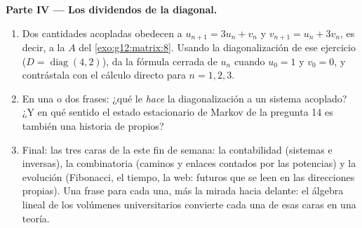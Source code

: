 \begin{problem}
\medskip
\noindent\textbf{Parte IV --- Los dividendos de la diagonal.}
\begin{enumerate}[resume]
  \item Dos cantidades acopladas obedecen a $u_{n+1} = 3u_n + v_n$ y
        $v_{n+1} = u_n + 3v_n$, es decir, a la  $A$ del
        \cref{exo:g12:matrix:8}. Usando la diagonalización de ese ejercicio
        ($D = \operatorname{diag}(4, 2)$), da la fórmula cerrada de $u_n$
        cuando $u_0 = 1$ y $v_0 = 0$, y contrástala con el cálculo directo
        para $n = 1, 2, 3$.
  \item En una o dos frases: ¿qué le \emph{hace} la diagonalización a un
        sistema acoplado? ¿Y en qué sentido el estado estacionario de
        Markov de la pregunta 14 es también una historia de 
        propios?
  \item Final: las tres caras de la  este fin de semana: la
        contabilidad (sistemas e inversas), la combinatoria (caminos y
        enlaces contados por las potencias) y la evolución (Fibonacci, el
        tiempo, la web: futuros que se leen en las direcciones propias).
        Una frase para cada una, más la mirada hacia delante: el álgebra
        lineal de los volúmenes universitarios convierte cada una de esas
        caras en una teoría.
\end{enumerate}
\end{problem}
